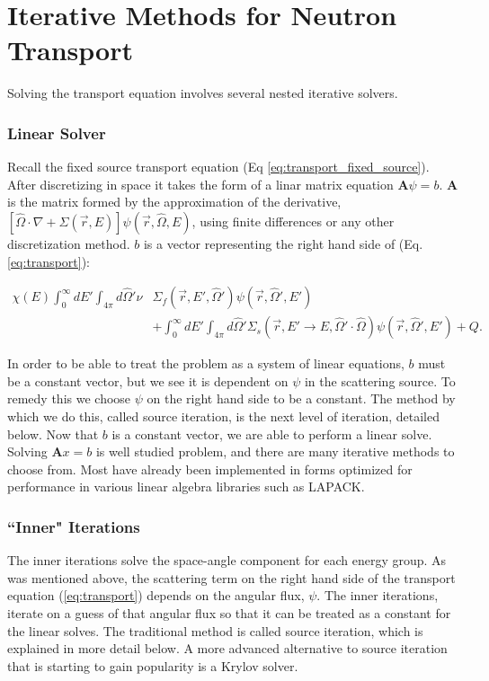 
\section{Iterative Methods for Neutron Transport}
Solving the transport equation involves several nested iterative solvers. 
\subsubsection{Linear Solver}
Recall the fixed source transport equation (Eq \ref{eq:transport_fixed_source}). After discretizing in space it takes the form of a linar matrix equation $\textbf{A}\psi = b$. $\textbf{A}$ is the matrix formed by the approximation of the derivative, $[\hat{\Omega} \cdot \nabla + \Sigma(\vec{r}, E)]\psi(\vec{r}, \hat{\Omega}, E)$, using finite differences or any other discretization method. $b$ is a vector representing the right hand side of (Eq. \ref{eq:transport}): 

\begin{align}
\chi(E) \int_0^\infty dE'  \int_{4\pi} d\hat{\Omega}' \nu &\Sigma_{f}(\vec{r}, E', \hat{\Omega}')\psi(\vec{r}, \hat{\Omega}', E') \nonumber \\ &+ \int_0^\infty dE' \int_{4\pi} d\hat{\Omega}' \Sigma_s(\vec{r}, E' \rightarrow E, \hat{\Omega}' \cdot \hat{\Omega})\psi(\vec{r}, \hat{\Omega}', E')  + Q. \nonumber
\end{align}

In order to be able to treat the problem as a system of linear equations, $b$ must be a constant vector, but we see it is dependent on $\psi$ in the scattering source. To remedy this we choose $\psi$ on the right hand side to be a constant. The method by which we do this, called source iteration, is the next level of iteration, detailed below. Now that $b$ is a constant vector, we are able to perform a linear solve. Solving $\textbf{A}x = b$ is well studied problem, and there are many iterative methods to choose from. Most have already been implemented in forms optimized for performance in various linear algebra libraries such as LAPACK.

\subsubsection{``Inner" Iterations}
The inner iterations solve the space-angle component for each energy group. As was mentioned above, the scattering term on the right hand side of the transport equation (\ref{eq:transport}) depends on the angular flux, $\psi$. The inner iterations, iterate on a guess of that angular flux so that it can be treated as a constant for the linear solves. The traditional method is called source iteration, which is explained in more detail below. A more advanced alternative to source iteration that is starting to gain popularity is a Krylov solver. 

